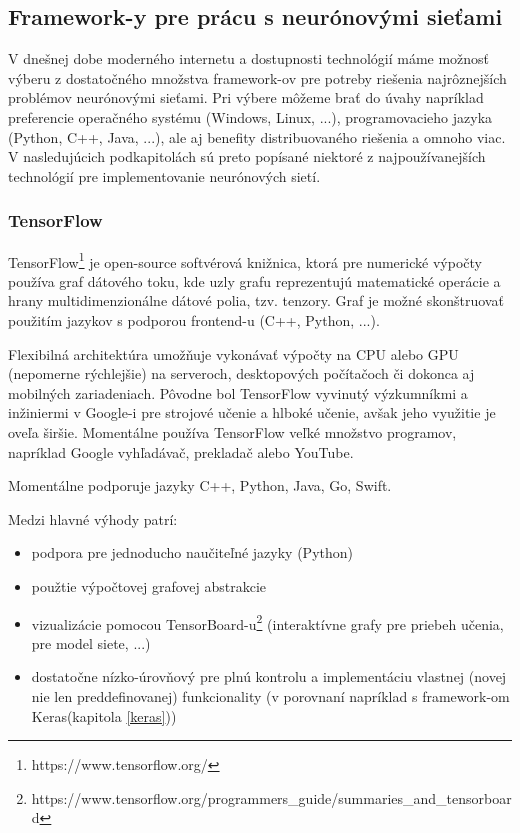 \subsection{Framework-y pre prácu s neurónovými sieťami}
V dnešnej dobe moderného internetu a dostupnosti technológií máme možnosť výberu z dostatočného množstva framework-ov pre potreby riešenia najrôznejších problémov neurónovými sieťami. Pri výbere môžeme brať do úvahy napríklad preferencie operačného systému (Windows, Linux, ...), programovacieho jazyka (Python, C++, Java, ...), ale aj benefity distribuovaného riešenia a omnoho viac. V nasledujúcich podkapitolách sú preto popísané niektoré z najpoužívanejších technológií pre implementovanie neurónových sietí. 

\subsubsection{TensorFlow}
TensorFlow\footnote{https://www.tensorflow.org/} je open-source softvérová knižnica, ktorá pre numerické výpočty používa graf dátového toku, kde uzly grafu reprezentujú matematické operácie a hrany multidimenzionálne dátové polia, tzv. tenzory. Graf je možné skonštruovať použitím jazykov s podporou frontend-u (C++, Python, ...). 

Flexibilná architektúra umožňuje vykonávať výpočty na CPU alebo GPU (nepomerne rýchlejšie) na serveroch, desktopových počítačoch či dokonca aj mobilných zariadeniach. Pôvodne bol TensorFlow vyvinutý výzkumníkmi a inžiniermi v Google-i pre strojové učenie a hlboké učenie, avšak jeho využitie je oveľa širšie. Momentálne používa TensorFlow veľké množstvo programov, napríklad Google vyhľadávač, prekladač alebo YouTube. 

Momentálne podporuje jazyky C++, Python, Java, Go, Swift.

Medzi hlavné výhody patrí:
\begin{itemize}
	\item podpora pre jednoducho naučiteľné jazyky (Python)
	\item použtie výpočtovej grafovej abstrakcie
	\item vizualizácie pomocou TensorBoard-u\footnote{https://www.tensorflow.org/programmers\_guide/summaries\_and\_tensorboard} (interaktívne grafy pre priebeh učenia, pre model siete, ...)
	\item dostatočne nízko-úrovňový pre plnú kontrolu a implementáciu vlastnej (novej nie len preddefinovanej) funkcionality (v porovnaní napríklad s framework-om Keras(kapitola \ref{keras}))
\end{itemize}

